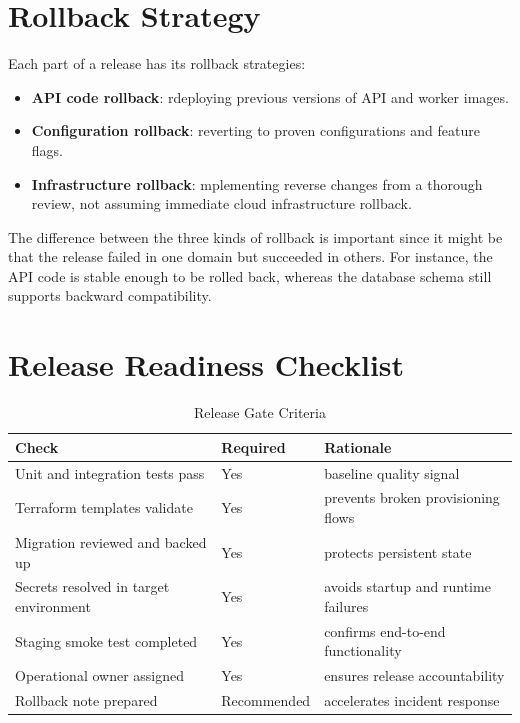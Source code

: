 \section{Rollback Strategy}
Each part of a release has its rollback strategies:



\begin{itemize}
    \item \textbf{API code rollback}: rdeploying previous versions of API and worker images. 
    \item \textbf{Configuration rollback}: reverting to proven configurations and feature flags.
    \item \textbf{Infrastructure rollback}: mplementing reverse changes from a thorough review, not assuming immediate cloud infrastructure rollback.
\end{itemize}


The difference between the three kinds of rollback is important since it might be that the release failed in one domain but succeeded in others. For instance, the API code is stable enough to be rolled back, whereas the database schema still supports backward compatibility.


\section{Release Readiness Checklist}
\begin{table}
\centering
\caption{Release Gate Criteria}
\label{tab:release_gate}
\begin{tabular}{|p{4.0cm}|p{2.2cm}|p{5.0cm}|}
\hline
\textbf{Check} & \textbf{Required} & \textbf{Rationale} \\ \hline
Unit and integration tests pass & Yes & baseline quality signal \\ \hline
Terraform templates validate & Yes & prevents broken provisioning flows \\ \hline
Migration reviewed and backed up & Yes & protects persistent state \\ \hline
Secrets resolved in target environment & Yes & avoids startup and runtime failures \\ \hline
Staging smoke test completed & Yes & confirms end-to-end functionality \\ \hline
Operational owner assigned & Yes & ensures release accountability \\ \hline
Rollback note prepared & Recommended & accelerates incident response \\ \hline
\end{tabular}
\end{table}

